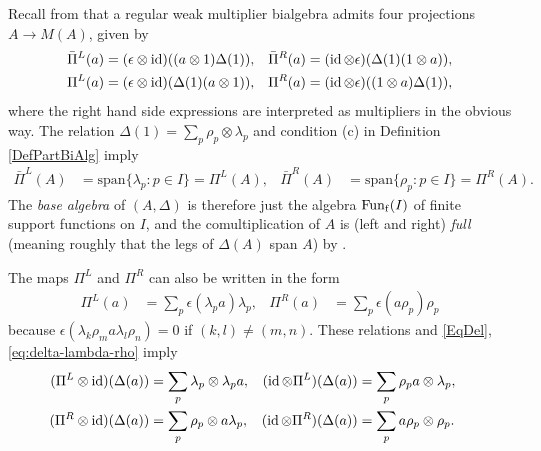 

Recall from \cite[Section 3]{Boh1} that a regular weak multiplier
bialgebra admits four projections $A\rightarrow M(A)$, given
by \begin{align*} \bar{\Pi}^L(a) = (\epsilon\otimes \operatorname{id})((a\otimes
  1)\Delta(1)),\quad & \bar{\Pi}^R(a) = (\operatorname{id}\otimes
  \epsilon)(\Delta(1)(1\otimes a)),\\ \Pi^L(a) = (\epsilon\otimes
  \operatorname{id})(\Delta(1)(a\otimes 1)),\quad& \Pi^R(a) =
  (\operatorname{id}\otimes\epsilon)((1\otimes a)\Delta(1)),\end{align*} where the
right hand side expressions are interpreted as multipliers in the
obvious way. The relation  $\Delta(1)=\sum_{p} \rho_{p} \otimes \lambda_{p}$ and  condition (c) in Definition \ref{DefPartBiAlg} imply
\begin{align*}
  \bar \Pi^{L}(A) &=\mathrm{span}\{\lambda_{p}:p\in I\} =  \Pi^{L}(A), &
  \bar \Pi^{R}(A) &= \mathrm{span}\{\rho_{p}:p\in I\} =\Pi^{R}(A).
\end{align*}
The \emph{base algebra} of $(A,\Delta)$ is therefore just the algebra
$\mathrm{Fun}_{\operatorname{\mathrm{f}}}(I)$ of finite support functions on $I$, and the
comultiplication of $A$ is (left and right) \emph{full} (meaning
roughly that the legs of $\Delta(A)$ span $A$) by \cite[Theorem
3.13]{Boh1}.  

 The maps $\Pi^{L}$ and $\Pi^{R}$ can also
be written in the form
\begin{align} \label{eq:pi} 
    \Pi^L(a) &%
=
    \sum_{p}\epsilon(\lambda_{p}a)\lambda_p, & \Pi^R(a) &
=    \sum_{p}\epsilon(a \rho_{p}) \rho_p
\end{align}
because $\epsilon(\lambda_{k}\rho_{m} a \lambda_{l}\rho_{n})=0$  if $(k,l)\neq(m,n)$. These relations and  \eqref{EqDel}, \eqref{eq:delta-lambda-rho} imply
\begin{align} \label{eq:pi-l-delta}
  (\Pi^{L} \otimes \operatorname{id})(\Delta(a)) &= \sum_{p} \lambda_{p}\otimes \lambda_{p}a, &
  (\operatorname{id} \otimes \Pi^{L})(\Delta(a)) &= \sum_{p} \rho_{p}a \otimes \lambda_{p}, & \\ \label{eq:pi-r-delta}
  (\Pi^{R} \otimes \operatorname{id})(\Delta(a)) &= \sum_{p} \rho_{p} \otimes a\lambda_{p}, &
  (\operatorname{id} \otimes \Pi^{R})(\Delta(a)) &= \sum_{p} a\rho_{p} \otimes \rho_{p}.
\end{align}

